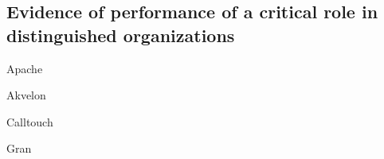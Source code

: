\subsection{%
    Evidence of \mrls performance of a critical role in distinguished organizations%
}
\label{subsec:Role}

{Apache}

\pagebreak

{Akvelon}

\pagebreak

{Calltouch}

\pagebreak

{Gran}

\pagebreak
